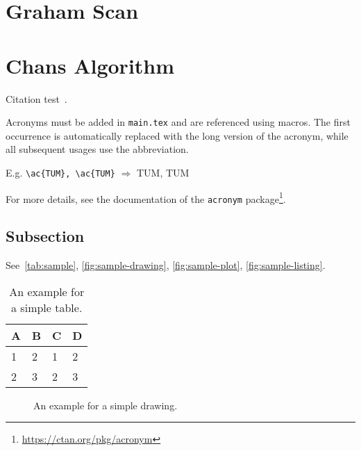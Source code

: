 


\section{Graham Scan}

\section{Chans Algorithm}


Citation test~\parencite{latex}.

Acronyms must be added in \texttt{main.tex} and are referenced using macros. The first occurrence is automatically replaced with the long version of the acronym, while all subsequent usages use the abbreviation.

E.g. \texttt{\textbackslash ac\{TUM\}, \textbackslash ac\{TUM\}} $\Rightarrow$ \ac{TUM}, \ac{TUM}

For more details, see the documentation of the \texttt{acronym} package\footnote{\url{https://ctan.org/pkg/acronym}}.
\subsection{Subsection}

See~\autoref{tab:sample}, \autoref{fig:sample-drawing}, \autoref{fig:sample-plot}, \autoref{fig:sample-listing}.

\begin{table}[htpb]
  \caption[Example table]{An example for a simple table.}\label{tab:sample}
  \centering
  \begin{tabular}{l l l l}
    \toprule
      A & B & C & D \\
    \midrule
      1 & 2 & 1 & 2 \\
      2 & 3 & 2 & 3 \\
    \bottomrule
  \end{tabular}
\end{table}

\begin{figure}[htpb]
  \centering
  \caption[Example drawing]{An example for a simple drawing.}\label{fig:sample-drawing}
\end{figure}

